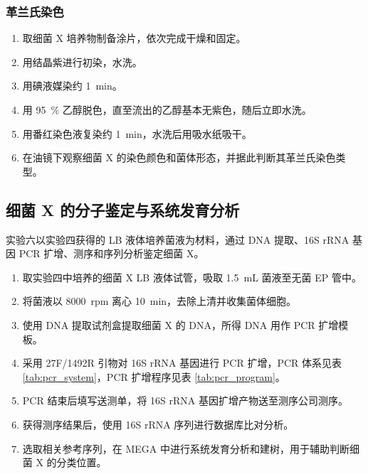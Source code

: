 \documentclass[UTF8,a4paper,12pt,fontset=none]{ctexart}
\numberwithin{figure}{section}
\begin{document}
\subsubsection{革兰氏染色}

\begin{enumerate}[label=\arabic*.]
    \item 取细菌 X 培养物制备涂片，依次完成干燥和固定。
    \item 用结晶紫进行初染，水洗。
    \item 用碘液媒染约 \SI{1}{min}。
    \item 用 \SI{95}{\percent} 乙醇脱色，直至流出的乙醇基本无紫色，随后立即水洗。
    \item 用番红染色液复染约 \SI{1}{min}，水洗后用吸水纸吸干。
    \item 在油镜下观察细菌 X 的染色颜色和菌体形态，并据此判断其革兰氏染色类型。
\end{enumerate}

\subsection{细菌 X 的分子鉴定与系统发育分析}

实验六以实验四获得的 LB 液体培养菌液为材料，通过 DNA 提取、16S rRNA 基因 PCR 扩增、测序和序列分析鉴定细菌 X。

\begin{enumerate}[label=\arabic*.]
    \item 取实验四中培养的细菌 X LB 液体试管，吸取 \SI{1.5}{mL} 菌液至无菌 EP 管中。
    \item 将菌液以 \SI{8000}{rpm} 离心 \SI{10}{min}，去除上清并收集菌体细胞。
    \item 使用 DNA 提取试剂盒提取细菌 X 的 DNA，所得 DNA 用作 PCR 扩增模板。
    \item 采用 27F/1492R 引物对 16S rRNA 基因进行 PCR 扩增，PCR 体系见表 \ref{tab:pcr_system}，PCR 扩增程序见表 \ref{tab:pcr_program}。
    \item PCR 结束后填写送测单，将 16S rRNA 基因扩增产物送至测序公司测序。
    \item 获得测序结果后，使用 16S rRNA 序列进行数据库比对分析。
    \item 选取相关参考序列，在 MEGA 中进行系统发育分析和建树，用于辅助判断细菌 X 的分类位置。
\end{enumerate}
\end{document}
